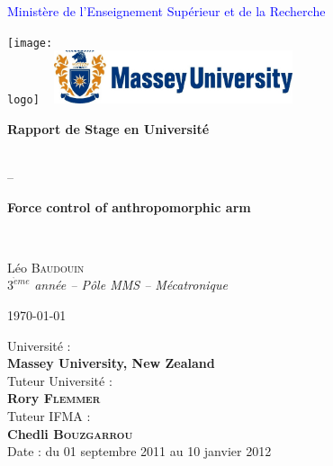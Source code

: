 \documentclass[a4paper,oneside,12pt]{article}
\newcommand{\leo}{L\'eo B\textsc{audouin}\xspace}
\newcommand{\rory}{Rory F\textsc{lemmer}\xspace}
\newcommand{\chedli}{Chedli B\textsc{ouzgarrou}\xspace}
\newcommand{\eme}[1]{$#1^{\grave{e}me}$}
\newcommand{\logo}{images/logo-IFMA.jpg}
\newcommand{\titre}{Force control of anthropomorphic arm}
\begin{document}
\thispagestyle{empty}
\textcolor{blue}{Ministère de l'Enseignement Supérieur et de la Recherche}\\
\vspace{5mm}
\begin{centering}

  \texttt{[image: \\logo]} ~
  \includegraphics[width=7.0cm]{images/logo-massey-university}

\end{centering}

\vspace{5mm}
\begin{center} 
\begin{large}
\textbf{Rapport de Stage en Universit\'e}
\end{large}
\\\vspace{3mm}--\vspace{3mm}\\
\begin{Huge}
\textbf{\titre}
\end{Huge}
\\
\vspace{10mm}
\begin{LARGE}
\leo\\

\vspace{5mm}
\eme{3} \textit{année -- P\^ole MMS -- Mécatronique}\\
\end{LARGE}
\vspace{5mm}
\today
\end{center}

\begin{flushright}
\begin{large}
Universit\'e :\\

\textbf{Massey University, New Zealand}\\

\vspace{3mm}
Tuteur Universit\'e :\\

\textbf{\rory}\\

\vspace{3mm}
Tuteur IFMA :\\

\textbf{\chedli}\\

\vspace{3mm}
Date : du 01 septembre 2011 au 10 janvier 2012
\end{large}
\end{flushright}
\end{document}
